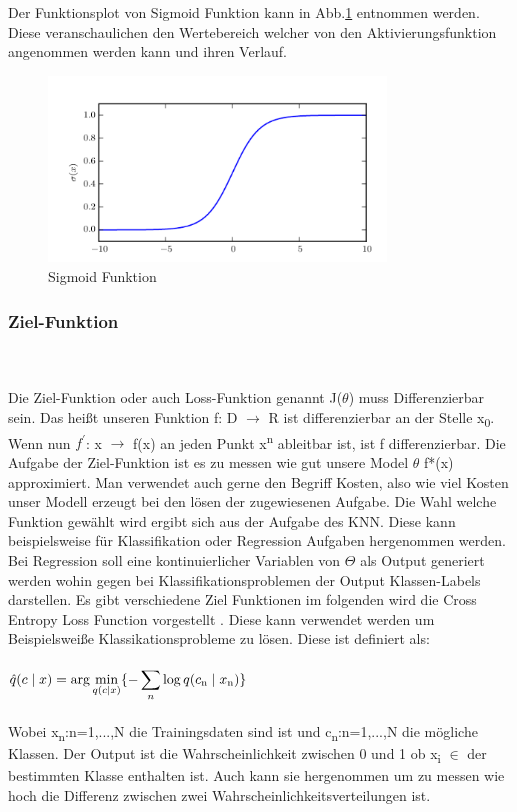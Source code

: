 \documentclass{llncs}
\begin{document}
\vspace{5 mm}
Der Funktionsplot von Sigmoid Funktion kann in  Abb.\ref{fig:Bild3} entnommen werden. Diese veranschaulichen den Wertebereich welcher von den Aktivierungsfunktion angenommen werden kann und ihren Verlauf. 
\begin{figure}[htbp] 
	\centering
	\includegraphics[width=0.8\textwidth]{sigmoid.png}
	\caption{Sigmoid Funktion}
	\label{fig:Bild3}
\end{figure}

\newpage
\subsubsection{Ziel-Funktion}\label{sec:Zielfunktion}
~\\\\
Die Ziel-Funktion oder auch Loss-Funktion genannt J($\theta$) muss Differenzierbar sein. Das heißt unseren Funktion f: D $\to$ R ist differenzierbar an der Stelle x\textsubscript{0}. Wenn nun $f^\prime$: x $\to$ f(x) an jeden Punkt x\textsuperscript{n} ableitbar ist, ist f differenzierbar. Die Aufgabe der Ziel-Funktion ist es zu messen wie gut unsere Model $\theta$ f*(x) approximiert. Man verwendet auch gerne den Begriff Kosten, also wie viel Kosten unser Modell erzeugt bei den lösen der zugewiesenen Aufgabe. Die Wahl welche Funktion gewählt wird ergibt sich aus der Aufgabe des KNN. Diese kann beispielsweise für Klassifikation oder Regression Aufgaben hergenommen werden. Bei Regression soll eine kontinuierlicher Variablen von $\Theta$ als Output generiert werden wohin gegen bei Klassifikationsproblemen der Output Klassen-Labels darstellen\cite{Grundlagen}. Es gibt verschiedene Ziel Funktionen im folgenden wird die Cross Entropy Loss Function vorgestellt \cite{crossentropy}. Diese kann verwendet werden um Beispielsweiße Klassikationsprobleme zu lösen. Diese ist definiert als:
\\\\
\begin{math}
\hat{q}(c\mid x)=\displaystyle\arg\min_{q(c\mid  x)}\{-\displaystyle\sum_{n}{\log q(c\textsubscript{n}\mid x\textsubscript{n})}\}
\end{math}
\\\\
Wobei  x\textsubscript{n}:n=1,...,N die Trainingsdaten sind ist und c\textsubscript{n}:n=1,...,N die mögliche Klassen. Der Output ist die Wahrscheinlichkeit zwischen 0 und 1 ob  x\textsubscript{i} $\in$ der bestimmten Klasse enthalten ist. Auch kann sie hergenommen um zu messen wie hoch die Differenz zwischen zwei Wahrscheinlichkeitsverteilungen ist.
\end{document}
